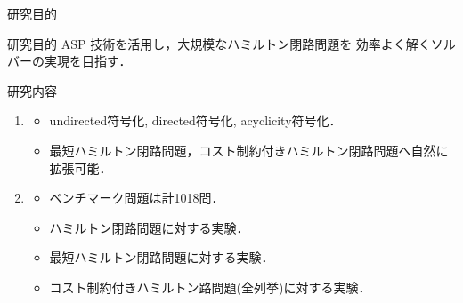 \documentclass[dvipdfmx,10pt]{beamer}
\begin{document}
\begin{frame}{研究目的}
  \begin{alertblock}{研究目的}
  ASP 技術を活用し，大規模なハミルトン閉路問題を
    効率よく解くソルバーの実現を目指す．
  \end{alertblock}
  \begin{block}{研究内容}
    \begin{enumerate}
    \item {}
      \begin{itemize}
      \item \textsf{undirected}符号化, \textsf{directed}符号化, \textsf{acyclicity}符号化．
      \item 最短ハミルトン閉路問題，コスト制約付きハミルトン閉路問題へ自然に拡張可能．
      \end{itemize}
    \item {}
      \begin{itemize}
      \item ベンチマーク問題は計1018問．
      \item ハミルトン閉路問題に対する実験．
      \item 最短ハミルトン閉路問題に対する実験．
      \item コスト制約付きハミルトン路問題(全列挙)に対する実験．
      \end{itemize}
    \end{enumerate}
  \end{block}
\end{frame}
\end{document}
